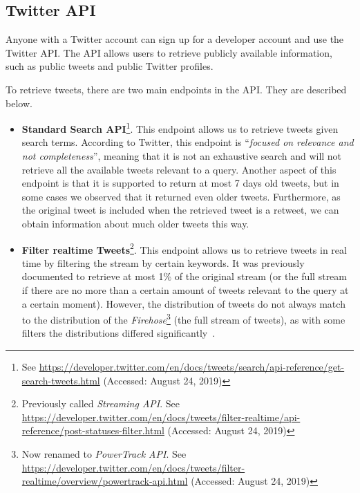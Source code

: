 \subsection{Twitter API}

Anyone with a Twitter account can sign up for a developer account and use the
Twitter API. The API allows users to retrieve publicly available information,
such as public tweets and public Twitter profiles.

To retrieve tweets, there are two main endpoints in the API. They are described
below.

\begin{itemize}
    \item {\bf Standard Search API}\footnote{\raggedright See
    \url{https://developer.twitter.com/en/docs/tweets/search/api-reference/get-search-tweets.html}
    (Accessed: August 24, 2019)}. 
    This endpoint allows us to retrieve tweets given search terms.
    According to Twitter, this endpoint is ``{\em focused on relevance and not
    completeness}'', meaning that it is not an exhaustive search and will not
    retrieve all the available tweets relevant to a query. 
    Another aspect of this endpoint is that it is supported to return at most 7
    days old tweets, but in some cases we observed that it returned even older
    tweets.
    Furthermore, as the original tweet is included when the retrieved tweet is a
    retweet, we can obtain information about much older tweets this way.

    \item {\bf Filter realtime Tweets}\footnote{\raggedright Previously called
    {\em Streaming API}. See
    \url{https://developer.twitter.com/en/docs/tweets/filter-realtime/api-reference/post-statuses-filter.html}
    (Accessed: August 24, 2019)}.
    This endpoint allows us to retrieve tweets in real time by filtering the
    stream by certain keywords.
    It was previously documented to retrieve at most 1\% of the original stream
    (or the full stream if there are no more than a certain amount of tweets
    relevant to the query at a certain moment).
    However, the distribution of tweets do not always match to the distribution
    of the {\em Firehose}\footnote{Now renamed to {\em PowerTrack API}. See
    \url{https://developer.twitter.com/en/docs/tweets/filter-realtime/overview/powertrack-api.html}
    (Accessed: August 24, 2019)} (the full stream of tweets), as with some
    filters the distributions differed
    significantly~\cite{morstatter2013sample}.
    
\end{itemize}


